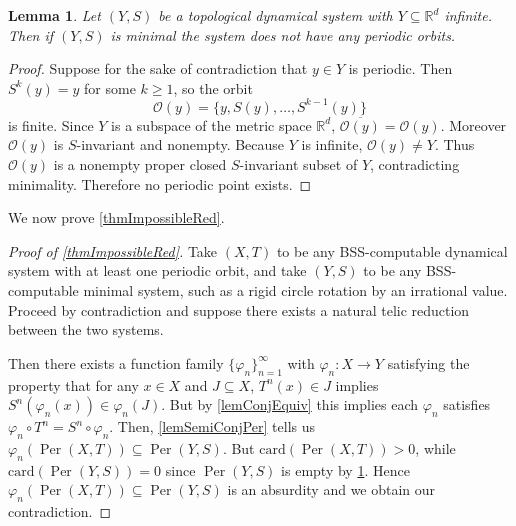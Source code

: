\documentclass{amsart}
\theoremstyle{theorem}
\newtheorem{lemma}[theorem]{Lemma}
\theoremstyle{remark}
\DeclareMathOperator{\Per}{Per}
\newcommand{\RR}{\mathbb{R}}
\begin{document}
\begin{lemma}\label{lemInfiniteMinimal}
Let $(Y, S)$ be a topological dynamical system with $Y \subseteq \RR^d$ infinite. Then if $(Y, S)$ is minimal the system does not have any periodic orbits.
\end{lemma}
\begin{proof}
Suppose for the sake of contradiction that $y\in Y$ is periodic. Then $S^k(y)=y$ for some $k\ge1$, so the orbit
\[
\mathcal{O}(y)=\{y,S(y),\dots,S^{k-1}(y)\}
\]
is finite. Since $Y$ is a subspace of the metric space $\mathbb{R}^d$, $\overline{\mathcal{O}(y)}=\mathcal{O}(y)$. Moreover $\mathcal{O}(y)$ is $S$-invariant and nonempty. Because $Y$ is infinite, $\mathcal{O}(y)\neq Y$. Thus $\mathcal{O}(y)$ is a nonempty proper closed $S$-invariant subset of $Y$, contradicting minimality. Therefore no periodic point exists.
\end{proof}

We now prove \cref{thmImpossibleRed}.

\begin{proof}[Proof of \cref{thmImpossibleRed}]
Take $(X, T)$ to be any BSS-computable dynamical system with at least one periodic orbit, and take $(Y, S)$ to be any BSS-computable minimal system, such as a rigid circle rotation by an irrational value.
Proceed by contradiction and suppose there exists a natural telic reduction between the two systems.

Then there exists a function family $\{\varphi_n\}_{n=1}^\infty$ with $\varphi_n:X\rightarrow Y$ satisfying the property that for any $x \in X$ and $J\subseteq X$, $T^n(x) \in J$ implies $S^n(\varphi_n(x)) \in \varphi_n(J)$.
But by \cref{lemConjEquiv} this implies each $\varphi_n$ satisfies $\varphi_n\circ T^n = S^n \circ \varphi_n$.
Then, \cref{lemSemiConjPer} tells us $\varphi_n(\Per(X, T)) \subseteq \Per(Y,S)$. But $\text{card}(\Per(X,T)) >0$, while $\text{card}(\Per(Y,S)) = 0$ since $\Per(Y,S)$ is empty by \cref{lemInfiniteMinimal}. Hence $\varphi_n(\Per(X,T)) \subseteq \Per(Y,S)$ is an absurdity and we obtain our contradiction.
\end{proof}




\end{document}
